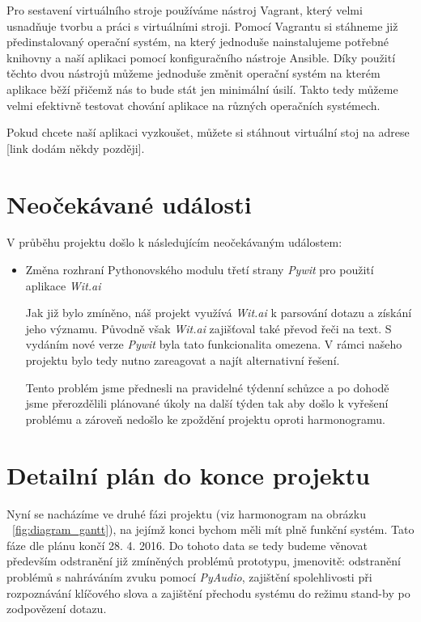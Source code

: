 \documentclass[12pt,a4paper]{article}
\begin{document}
Pro sestavení virtuálního stroje používáme nástroj Vagrant, který velmi usnadňuje tvorbu a práci s virtuálními stroji. Pomocí Vagrantu si stáhneme již předinstalovaný operační systém, na který jednoduše nainstalujeme potřebné knihovny a naší aplikaci pomocí konfiguračního nástroje Ansible. Díky použití těchto dvou nástrojů můžeme jednoduše změnit operační systém na kterém aplikace běží přičemž nás to bude stát jen minimální úsilí. Takto tedy můžeme velmi efektivně testovat chování aplikace na různých operačních systémech.

Pokud chcete naší aplikaci vyzkoušet, můžete si stáhnout virtuální stoj na adrese [link dodám někdy později].

\section*{Neočekávané události}
V průběhu projektu došlo k následujícím neočekávaným událostem:
\begin{itemize}
	\item Změna rozhraní Pythonovského modulu třetí strany \textit{Pywit} pro použití aplikace \textit{Wit.ai}
	
	Jak již bylo zmíněno, náš projekt využívá \textit{Wit.ai} k parsování dotazu a získání jeho významu. Původně však \textit{Wit.ai} zajišťoval také převod řeči na text. S vydáním nové verze \textit{Pywit} byla tato funkcionalita omezena. V rámci našeho projektu bylo tedy nutno zareagovat a najít alternativní řešení. 
	
	Tento problém jsme přednesli na pravidelné týdenní schůzce a po dohodě jsme přerozdělili plánované úkoly na další týden tak aby došlo k vyřešení problému a zároveň nedošlo ke zpoždění projektu oproti harmonogramu.
	

\end{itemize}

\section*{Detailní plán do konce projektu}
Nyní se nacházíme ve druhé fázi projektu (viz harmonogram na obrázku ~\ref{fig:diagram_gantt}), na jejímž konci bychom měli mít plně funkční systém. Tato fáze dle plánu končí 28. 4. 2016. Do tohoto data se tedy budeme věnovat především odstranění již zmíněných problémů prototypu, jmenovitě: odstranění problémů s nahráváním zvuku pomocí \textit{PyAudio}, zajištění spolehlivosti při rozpoznávání klíčového slova a zajištění přechodu systému do režimu stand-by po zodpovězení dotazu.
\end{document}
